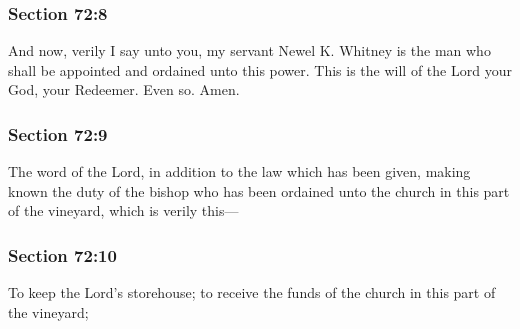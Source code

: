 	\subsubsection{Section 72:8} %
		\label{DC72-8}

		And now, verily I say unto you, my servant Newel K. Whitney is the man who shall be appointed and ordained unto this power.  This is the will of the Lord your God, your Redeemer.  Even so.  Amen.


	\subsubsection{Section 72:9} %
		\label{DC72-9}

		The word of the Lord, in addition to the law which has been given, making known the duty of the bishop who has been ordained unto the church in this part of the vineyard, which is verily this---


	\subsubsection{Section 72:10} %
		\label{DC72-10}

		To keep the Lord's storehouse; to receive the funds of the church in this part of the vineyard;


